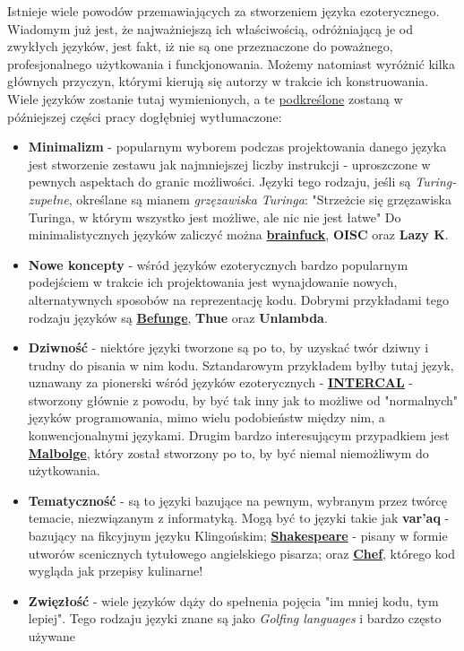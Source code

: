 \documentclass[fleqn,10pt]{SelfArx} %
\begin{document}
Istnieje wiele powodów przemawiających za stworzeniem języka ezoterycznego.
Wiadomym już jest, że najważniejszą ich właściwością, odróżniającą je od zwykłych języków,
jest fakt, iż nie są one przeznaczone do poważnego, profesjonalnego użytkowania i funckjonowania.
Możemy natomiast wyróżnić kilka głównych przyczyn, którymi kierują się autorzy w trakcie ich konstruowania.
Wiele języków zostanie tutaj wymienionych, a te \underline{podkreślone} zostaną w późniejszej części pracy dogłębniej wytłumaczone:
\begin{itemize}
	\item \textbf{Minimalizm} - popularnym wyborem podczas projektowania danego języka jest stworzenie zestawu jak najmniejszej liczby instrukcji - 
	uproszczone w pewnych aspektach do granic możliwości.
	Języki tego rodzaju, jeśli są \textit{Turing-zupełne}, określane są mianem \textit{grzęzawiska Turinga}:
	"Strzeżcie się grzęzawiska Turinga, w którym wszystko jest możliwe, ale nic nie jest łatwe"\cite{perlisAlan:epigrams}
	Do minimalistycznych języków zaliczyć można \underline{\textbf{brainfuck}}, \textbf{OISC} oraz \textbf{Lazy K}.
	\item \textbf{Nowe koncepty} - wśród języków ezoterycznych bardzo popularnym podejściem w trakcie ich projektowania jest 
	wynajdowanie nowych, alternatywnych sposobów na reprezentację kodu. Dobrymi przykładami tego rodzaju języków są \underline{\textbf{Befunge}}, \textbf{Thue} oraz \textbf{Unlambda}.
	\item \textbf{Dziwność} - niektóre języki tworzone są po to, by uzyskać twór dziwny i trudny do pisania w nim kodu.
	Sztandarowym przykładem byłby tutaj język, uznawany za pionerski wśród języków ezoterycznych - \hyperlink{oldestLang}{\underline{\textbf{INTERCAL}}} - stworzony głównie z powodu,
	by być tak inny jak to możliwe od "normalnych" języków programowania, mimo wielu podobieństw między nim, a konwencjonalnymi językami.
	Drugim bardzo interesującym przypadkiem jest \underline{\textbf{Malbolge}}, który został stworzony po to, by być niemal niemożliwym do użytkowania.
	\item \textbf{Tematyczność} - są to języki bazujące na pewnym, wybranym przez twórcę temacie, niezwiązanym z informatyką.
	Mogą być to języki takie jak \textbf{var'aq} - bazujący na fikcyjnym języku Klingońskim; \underline{\textbf{Shakespeare}} - pisany w formie utworów scenicznych tytułowego angielskiego pisarza;
	oraz \underline{\textbf{Chef}}, którego kod wygląda jak przepisy kulinarne!
	\item \textbf{Zwięzłość} - wiele języków dąży do spełnenia pojęcia "im mniej kodu, tym lepiej". Tego rodzaju języki znane są jako \textit{Golfing languages} i bardzo często używane

\end{itemize}
\end{document}

